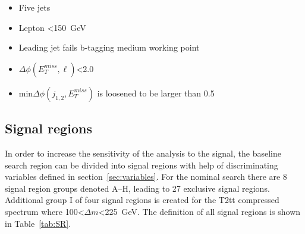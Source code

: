 \begin{itemize}
\item Five jets
\item Lepton \pt<150~GeV
\item Leading jet fails b-tagging medium working point
\item $\Delta \phi(E_{T}^{miss}, \ell)$<2.0 
\item min$\Delta \phi (j_{1,2}, E_{T}^{miss})$ is loosened to be larger than  0.5

\end{itemize}

\subsection{Signal regions~\label{sec:sr}}

In order to increase the sensitivity of the analysis to the signal, the baseline search region can be divided into signal regions with help of discriminating variables defined in section~\ref{sec:variables}. For the nominal search there are 8 signal region groups denoted A--H, leading to 27 exclusive signal regions. Additional group I of four signal regions is created for the T2tt compressed spectrum where 100<$\Delta m$<225~GeV. The definition of all signal regions is shown in Table~\ref{tab:SR}.

